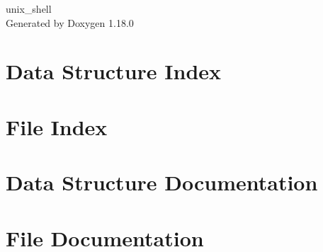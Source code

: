 \documentclass[twoside]{book}
\newcommand{\+}{\discretionary{\mbox{\scriptsize$\hookleftarrow$}}{}{}}
\newcommand{\clearemptydoublepage}{%
    \newpage{\pagestyle{empty}\cleardoublepage}%
  }
\begin{document}
  \raggedbottom
    \hypersetup{pageanchor=false,
                bookmarksnumbered=true,
                pdfencoding=unicode
               }
  \begin{titlepage}
  \vspace*{7cm}
  \begin{center}%
  {\Large unix\+\_\+shell}\\
  \vspace*{1cm}
  {\large Generated by Doxygen 1.18.0}\\
  \end{center}
  \end{titlepage}
  \clearemptydoublepage
  \tableofcontents
  \clearemptydoublepage
  \hypersetup{pageanchor=true}

\chapter{Data Structure Index}

\chapter{File Index}

\chapter{Data Structure Documentation}


\chapter{File Documentation}
















  \backmatter
  \newpage
  \clearemptydoublepage
  \printindex
\end{document}
